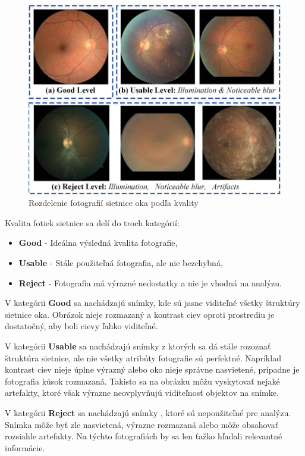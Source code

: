 \documentclass[a4paper, 11pt]{article}
\begin{document}
\begin{figure}[t!]
    \centering
    \includegraphics[width=0.7\linewidth]{images/quality_levels.png}
    \caption{Rozdelenie fotografií sietnice oka podľa kvality \cite{OCY_cinan}}
    \label{fig:quality levels}
\end{figure}

Kvalita fotiek sietnice \cite{OCY_cinan} sa delí do troch kategórií:

\begin{itemize}
    \item \textbf{Good} - Ideálna výsledná kvalita fotografie,
    \item \textbf{Usable} - Stále použiteľná fotografia, ale nie bezchybná,
    \item \textbf{Reject} - Fotografia má výrazné nedostatky a nie je vhodná na analýzu.
\end{itemize}

\noindent V kategórii \textbf{Good} sa nachádzajú snímky\cite{OCY_cinan}, kde sú jasne viditeľné všetky štruktúry sietnice oka. Obrázok nieje rozmazaný a kontrast ciev oproti prostrediu je dostatočný, aby boli cievy ľahko viditeľné.

V kategórii \textbf{Usable} sa nachádzajú snímky \cite{OCY_cinan} z ktorých sa dá stále rozoznať štruktúra sietnice, ale nie všetky atribúty fotografie sú perfektné. Napríklad kontrast ciev nieje úplne výrazný alebo oko nieje správne nasvietené, prípadne je fotografia kúsok rozmazaná. Takisto sa na obrázku môžu vyskytovať nejaké artefakty, ktoré však výrazne neovplyvňujú viditeľnosť objektov na snímke.

V kategórii \textbf{Reject} sa nachádzajú snímky \cite{OCY_cinan}, ktoré sú nepoužiteľné pre analýzu. Snímka môže byť zle nasvietená, výrazne rozmazaná alebo môže obsahovať rozsiahle artefakty. Na týchto fotografiách by sa len ťažko hľadali relevantné informácie.
\end{document}

